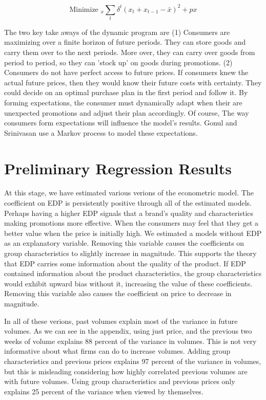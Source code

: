 \documentclass{article}
\begin{document}
$$ \text{Minimize }_{x} \sum_t \delta^t (x_t + x_{t-1} - \bar{x})^2 + p x $$

The two key take aways of the dynamic program are (1) Consumers are maximizing over a finite horizon of future periods. They can store goods and carry them over to the next periods. More over, they can carry over goods from period to period, so they can 'stock up' on goods during promotions. (2) Consumers do not have perfect access to future prices. If consumers knew the actual future prices, then they would know their future costs with certainty. They could decide on an optimal purchase plan in the first period and follow it. By forming expectations, the consumer must dynamically adapt when their are unexpected promotions and adjust their plan accordingly. Of course, The way consumers form expectations will influence the model's results. Gonul and Srinivasan use a Markov process to model these expectations.


\section{Preliminary Regression Results}

At this stage, we have estimated various verions of the econometric model. The coefficient on EDP is persistently positive through all of the estimated models. Perhaps having a higher EDP signals that a brand's quality and characteristics making promotions more effective. When the consumers may feel that they get a better value when the price is initially high. We estimated a models without EDP as an explanatory variable. Removing this variable causes the coefficients on group characteristics to slightly increase in magnitude. This supports the theory that EDP carries some information about the quality of the product. If EDP contained information about the product characteristics, the group characteristics would exhibit upward bias without it, increasing the value of these coefficients. Removing this variable also causes the coefficient on price to decrease in magnitude.

In all of these verions, past volumes explain most of the variance in future volumes. As we can see in the appendix, using just price, and the previous two weeks of volume explains 88 percent of the variance in volumes. This is not very informative about what firms can do to increase volumes. Adding  group characteristics and previous prices explains 97 percent of the variance in volumes, but this is misleading considering how highly correlated previous volumes are with future volumes. Using group characteristics and previous prices only explains 25 percent of the variance when viewed by themselves. 
\end{document}
